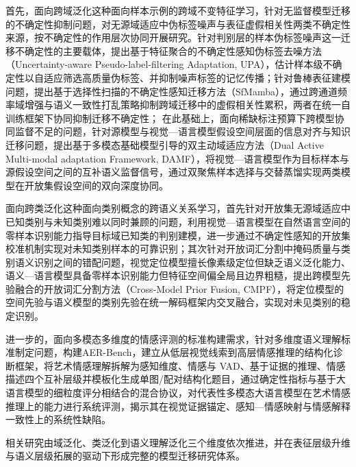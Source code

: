首先，面向跨域泛化这种面向样本示例的跨域不变特征学习，针对无监督模型迁移的不确定性抑制问题，对无源域适应中伪标签噪声与表征虚假相关性两类不确定性来源，按不确定性的作用层次协同开展研究。针对判别层的样本伪标签噪声这一迁移不确定性的主要载体，提出基于特征聚合的不确定性感知伪标签去噪方法（Uncertainty-aware Pseudo-label-filtering Adaptation, UPA），估计样本级不确定性以自适应筛选高质量伪标签、并抑制噪声标签的记忆传播；针对鲁棒表征建模问题，提出基于选择性扫描的不确定性感知迁移方法（SfMamba），通过跨通道频率域增强与语义一致性打乱策略抑制跨域迁移中的虚假相关性累积，两者在统一自训练框架下协同抑制迁移不确定性；
在此基础上，面向稀缺标注预算下跨模型协同监督不足的问题，针对源模型与视觉—语言模型假设空间层面的信息对齐与知识迁移问题，提出基于多模态基础模型引导的双主动域适应方法（Dual Active Multi-modal adaptation Framework, DAMF），将视觉—语言模型作为目标样本与源假设空间之间的互补语义监督信号，通过双聚焦样本选择与交替蒸馏实现两类模型在开放集假设空间的双向深度协同。

面向跨类泛化这种面向类别概念的跨语义关系学习，首先针对开放集无源域适应中已知类别与未知类别难以同时兼顾的问题，利用视觉—语言模型在自然语言空间的零样本识别能力指导目标域已知类的判别建模，进一步通过不确定性感知的开放集校准机制实现对未知类别样本的可靠识别；其次针对开放词汇分割中掩码质量与类别语义识别之间的错配问题，视觉定位模型擅长像素级定位但缺乏语义泛化能力、语义—语言模型具备零样本识别能力但特征空间偏全局且边界粗糙，提出跨模型先验融合的开放词汇分割方法（Cross-Model Prior Fusion, CMPF），将定位模型的空间先验与语义模型的类别先验在统一解码框架内交叉融合，实现对未见类别的稳定识别。

进一步的，面向多模态多维度的情感评测的标准构建需求，针对多维度语义理解标准制定问题，构建AER-Bench，建立从低层视觉线索到高层情感推理的结构化诊断框架，将艺术情感理解拆解为感知维度、情感与 VAD、基于证据的推理、情感描述四个互补层级并模板化生成单图/配对结构化题目，通过确定性指标与基于大语言模型的细粒度评分相结合的混合协议，对代表性多模态大语言模型在艺术情感推理上的能力进行系统评测，揭示其在视觉证据锚定、感知—情感映射与情感解释一致性上的系统性缺陷。

相关研究由域泛化、类泛化到语义理解泛化三个维度依次推进，并在表征层级升维与语义层级拓展的驱动下形成完整的模型迁移研究体系。
